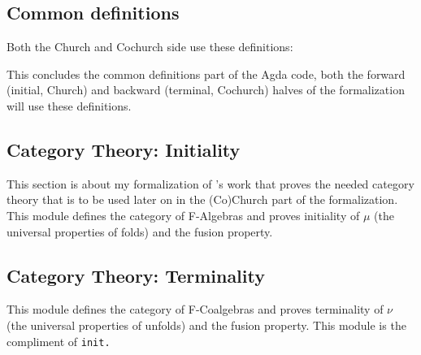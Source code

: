 \subsection{Common definitions}
Both the Church and Cochurch side use these definitions:

%
This concludes the common definitions part of the Agda code, both the forward (initial, Church) and backward (terminal, Cochurch) halves of the formalization will use these definitions.

\subsection{Category Theory: Initiality}
This section is about my formalization of \cite{Harper2011}'s work that proves the needed category theory that is to be used later on in the (Co)Church part of the formalization.
This module defines the category of F-Algebras and proves initiality of $\mu$ (the universal properties of folds) and the fusion property.



\subsection{Category Theory: Terminality}
This module defines the category of F-Coalgebras and proves terminality of $\nu$ (the universal properties of unfolds) and the fusion property.
This module is the compliment of \tt{init}.


